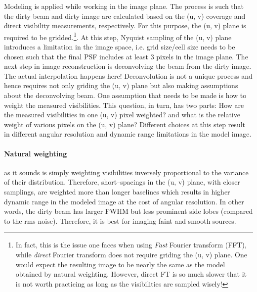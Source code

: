 \documentclass[a4wide,12pt]{book}
\begin{document}
Modeling is applied while working in the image plane. The process is such that the dirty beam and dirty image are calculated based on the (u, v) coverage and direct visibility measurements, respectively. For this purpose, the (u, v) plane is required to be gridded.\footnote{In fact, this is the issue one faces when using \emph{Fast} Fourier transform (FFT), while \emph{direct} Fourier transform does not require griding the (u, v) plane. One would expect the resulting image to be nearly the same as the model obtained by natural weighting. However, direct FT is so much slower that it is not worth practicing as long as the visibilities are sampled wisely!}. At this step, Nyquist sampling of the (u, v) plane introduces a limitation in the image space, i.e. grid size/cell size needs to  be chosen such that the final PSF includes at least 3 pixels in the image plane. The next step in image reconstruction is deconvolving the beam from the dirty image. The actual interpolation happens here! Deconvolution is not a unique process and hence requires not only griding the (u, v) plane but also making assumptions about the deconvolving beam. One assumption that needs to be made is how to weight the measured visibilities. This question, in turn, has two parts: How are the measured visibilities in one (u, v) pixel weighted? and what is the relative weight of various pixels on the (u, v) plane? Different choices at this step result in different angular resolution and dynamic range limitations in the model image.

\paragraph*{Natural weighting} as it sounds is simply weighting visibilities inversely proportional to the variance of their distribution.
Therefore, short--spacings in the (u, v) plane, with closer samplings, are weighted more than longer baselines which results in higher dynamic range in the modeled image at the cost of angular resolution. In other words, the dirty beam has larger FWHM but less prominent side lobes (compared to the rms noise). Therefore, it is best for imaging faint and smooth sources. 
\end{document}

